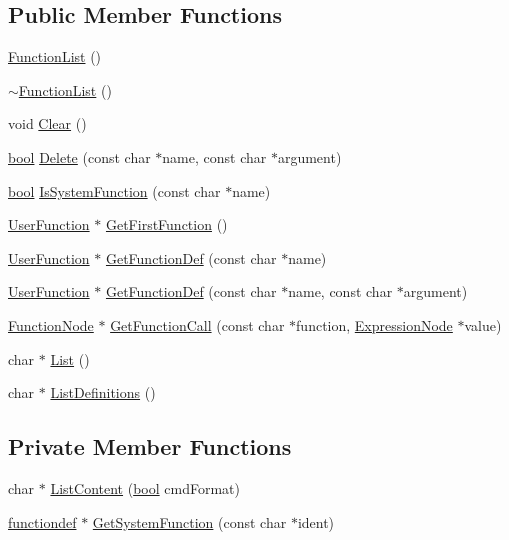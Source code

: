 \subsection*{Public Member Functions}
\begin{DoxyCompactItemize}
\item 
\hyperlink{classFunctionList_a602bd0647dbe5ef4911100c52d1c9388}{Function\+List} ()
\item 
\hyperlink{classFunctionList_a0aa9fcb67c0c042e371c3efb32a1e1e4}{$\sim$\+Function\+List} ()
\item 
void \hyperlink{classFunctionList_afe4ccb5f29da8542a3df84f3fe64f4bb}{Clear} ()
\item 
\hyperlink{platform_8h_a1062901a7428fdd9c7f180f5e01ea056}{bool} \hyperlink{classFunctionList_ae0e646a32dd118de74ab8d06f3bb775a}{Delete} (const char $\ast$name, const char $\ast$argument)
\item 
\hyperlink{platform_8h_a1062901a7428fdd9c7f180f5e01ea056}{bool} \hyperlink{classFunctionList_a7c5872fe4a522983041ac12c2cb37ea3}{Is\+System\+Function} (const char $\ast$name)
\item 
\hyperlink{classUserFunction}{User\+Function} $\ast$ \hyperlink{classFunctionList_af7c68faadee0f219109e02f486b0f239}{Get\+First\+Function} ()
\item 
\hyperlink{classUserFunction}{User\+Function} $\ast$ \hyperlink{classFunctionList_acf0716fd18c32a6d52a947052060a2a1}{Get\+Function\+Def} (const char $\ast$name)
\item 
\hyperlink{classUserFunction}{User\+Function} $\ast$ \hyperlink{classFunctionList_a867e5afb83ce8d6ee658290a76f54614}{Get\+Function\+Def} (const char $\ast$name, const char $\ast$argument)
\item 
\hyperlink{classFunctionNode}{Function\+Node} $\ast$ \hyperlink{classFunctionList_ae8dc9d2913429faefdfed463ae3272c1}{Get\+Function\+Call} (const char $\ast$function, \hyperlink{classExpressionNode}{Expression\+Node} $\ast$value)
\item 
char $\ast$ \hyperlink{classFunctionList_a667bf5683f0b7332b5607781df53c728}{List} ()
\item 
char $\ast$ \hyperlink{classFunctionList_af69593a40790f4d696a74e46c3c9e552}{List\+Definitions} ()
\end{DoxyCompactItemize}
\subsection*{Private Member Functions}
\begin{DoxyCompactItemize}
\item 
char $\ast$ \hyperlink{classFunctionList_ac87c5ecfbdfd7aa7c9c8c611b70c3a63}{List\+Content} (\hyperlink{platform_8h_a1062901a7428fdd9c7f180f5e01ea056}{bool} cmd\+Format)
\item 
\hyperlink{structfunctiondef}{functiondef} $\ast$ \hyperlink{classFunctionList_aabcebb1bdf56aee163f96483dcdc603c}{Get\+System\+Function} (const char $\ast$ident)
\end{DoxyCompactItemize}
